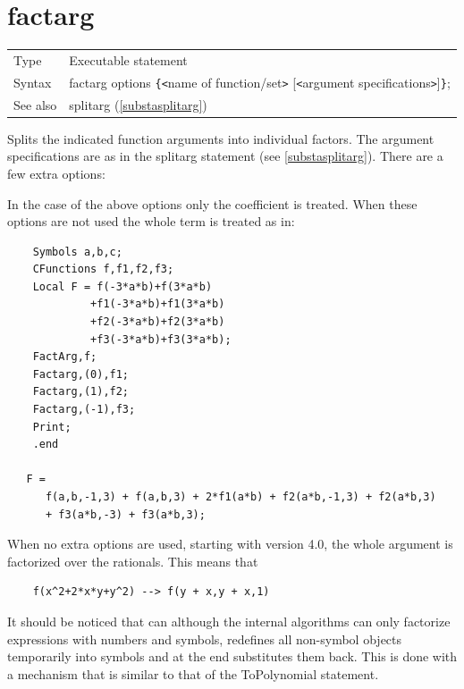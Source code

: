 
\section{factarg}
\label{substafactarg}

\noindent \begin{tabular}{ll}
Type & Executable statement\\
Syntax & factarg options \verb:{:{\tt<}name of function/set{\tt>}
                [{\tt<}argument specifications{\tt>}]\verb:}:;
\\ See also & splitarg (\ref{substasplitarg})
\end{tabular} \vspace{4mm}

\noindent Splits the indicated function arguments into individual factors. The argument specifications 
are as in the splitarg statement (see 
\ref{substasplitarg}). There are a few extra options:




\noindent In the case of the above options only the coefficient is treated. 
When these options are not used the whole term is treated as in:
\begin{verbatim}
    Symbols a,b,c;
    CFunctions f,f1,f2,f3;
    Local F = f(-3*a*b)+f(3*a*b)
             +f1(-3*a*b)+f1(3*a*b)
             +f2(-3*a*b)+f2(3*a*b)
             +f3(-3*a*b)+f3(3*a*b);
    FactArg,f;
    Factarg,(0),f1;
    Factarg,(1),f2;
    Factarg,(-1),f3;
    Print;
    .end

   F =
      f(a,b,-1,3) + f(a,b,3) + 2*f1(a*b) + f2(a*b,-1,3) + f2(a*b,3)
      + f3(a*b,-3) + f3(a*b,3);
\end{verbatim}
When no extra options are used, starting with version 4.0, the whole 
argument is factorized over the rationals. This means that
\begin{verbatim}
    f(x^2+2*x*y+y^2) --> f(y + x,y + x,1)
\end{verbatim}
It should be noticed that \FORM{} can although the internal algorithms can
only factorize expressions with numbers and symbols, \FORM{} redefines all
non-symbol objects temporarily into symbols and at the end substitutes them 
back. This is done with a mechanism that is similar to that of the 
ToPolynomial statement.

